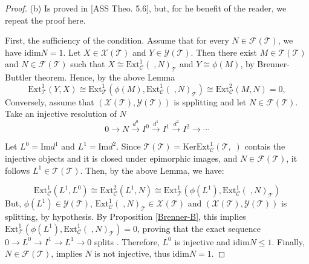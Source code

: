\documentclass{amsart}
\theoremstyle{plain}
\numberwithin{equation}{section}
\begin{document}
\begin{proof}
(b) Is proved in [ASS Theo. 5.6], but, for he benefit of the reader, we
repeat the proof here.

First, the sufficiency of the condition. Assume that for every $N\in \mathscr{F}(\mathcal{T})$, we have $\mathrm{idim}N=1$. Let $X\in \mathscr{X}(\mathcal{T})$ and $Y\in \mathscr{Y}(\mathcal{T})$. Then there exist $M\in \mathscr{T}(\mathcal{T})$ and $N\in \mathscr{F}(\mathcal{T})$ such that $X\cong \mathrm{Ext}_{\mathcal{C}}^{1}(\;,N)_{\mathcal{T}}$ and $Y\cong \phi
(M)$, by Brenner-Buttler theorem. Hence, by the above Lemma
\begin{equation*}
\mathrm{Ext}_{\mathcal{T}}^{1}(Y,X)\cong \mathrm{Ext}_{\mathcal{T}}^{1}(\phi
(M),\mathrm{Ext}_{\mathcal{C}}^{1}(\;,N)_{\mathcal{T}})\cong \mathrm{Ext}_{\mathcal{C}}^{2}(M,N)=0,
\end{equation*}
Conversely, assume that $(\mathscr{X}(\mathcal{T}),\mathscr{Y}(\mathcal{T}))$
is spplitting and let $N\in \mathscr{F}(\mathcal{T})$. Take an injective
resolution of $N$
\begin{equation*}
0\rightarrow N\xrightarrow{d^0}I^{0}\xrightarrow{d^1}I^{1}\xrightarrow{d^2}I^{2}\rightarrow \cdots
\end{equation*}

Let $L^{0}=\mathrm{Im}d^{1}$ and $L^{1}=\mathrm{Im}d^{2}$. Since $\mathscr{T}(\mathcal{T})=\mathrm{Ker}\mathrm{Ext}_{\mathcal{C}}^{1}(\mathcal{T},\;)$
contais the injective objects and it is closed under epimorphic images, and $N\in \mathscr{F}(\mathcal{T})$, it follows $L^{1}\in \mathscr{T}(\mathcal{T}) $. Then, by the above Lemma, we have:

\begin{equation*}
\mathrm{Ext}_{\mathcal{C}}^{1}(L^{1},L^{0})\cong \mathrm{Ext}_{\mathcal{C}}^{2}(L^{1},N)\cong \mathrm{Ext}_{\mathcal{T}}^{1}(\phi (L^{1}),\mathrm{Ext}_{\mathcal{C}}^{1}(\;,N)_{\mathcal{T}})
\end{equation*}But, $\phi (L^{1})\in \mathscr{Y}(\mathcal{T})$, $\mathrm{Ext}_{\mathcal{C}}^{1}(\;,N)_{\mathcal{T}}\in \mathscr{X}(\mathcal{T})$ and $(\mathscr{X}(\mathcal{T}),\mathscr{Y}(\mathcal{T}))$ is splitting, by hypothesis. By
Proposition \ref{Brenner-B}, this implies $\mathrm{Ext}_{\mathcal{T}}^{1}(\phi (L^{1}),\mathrm{Ext}_{\mathcal{C}}^{1}(\;,N)_{\mathcal{T}})=0$,
proving that the exact sequence $0\rightarrow L^{0}\rightarrow
I^{1}\rightarrow L^{1}\rightarrow 0$ splits . Therefore, $L^{0}$ is
injective and $\mathrm{idim}N\leq 1$. Finally, $N\in \mathscr{F}(\mathcal{T}) $, implies $N$ is not injective, thus $\mathrm{idim}N=1$.


\end{proof}
\end{document}

